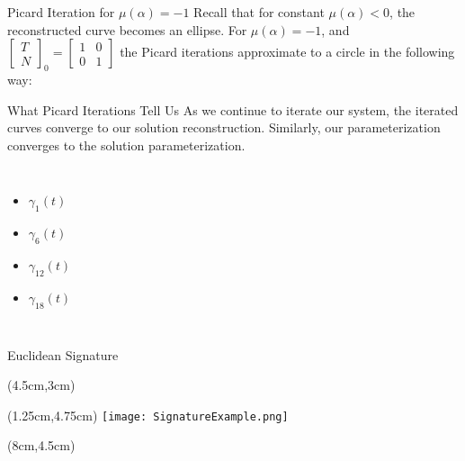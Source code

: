 \documentclass[]{beamer}
\begin{document}
\begin{frame}{Picard Iteration for $\mu(\alpha)=-1$}
Recall that for constant $\mu(\alpha)<0$, the reconstructed curve becomes an ellipse. For $\mu(\alpha)=-1$, and $\begin{bmatrix}
T\\
N
\end{bmatrix}_0=\begin{bmatrix}
1&0\\
0&1
\end{bmatrix}$ the Picard iterations approximate to a circle in the following way:
\begin{center}
\end{center}
\end{frame}
\begin{frame}{What Picard Iterations Tell Us}
    As we continue to iterate our system, the iterated curves converge to our solution reconstruction. Similarly, our parameterization converges to the solution parameterization. 
\begin{columns}
\column{8cm}
\column{3cm}
\begin{itemize}
\color{blue}
\item $\gamma_1(t)$
\color{red}
\item $\gamma_6(t)$
\color{green}
\item $\gamma_{12}(t)$
\color{purple}
\item $\gamma_{18}(t)$
\end{itemize}


\end{columns}    

\end{frame}



\begin{frame}{Euclidean Signature}

\begin{textblock*}{5cm}(4.5cm,3cm) %
\end{textblock*}

\begin{textblock*}{7cm}(1.25cm,4.75cm) %
\texttt{[image: SignatureExample.png]}
\end{textblock*}

\begin{textblock*}{4cm}(8cm,4.5cm) %
\end{textblock*}

\end{frame}
\end{document}
